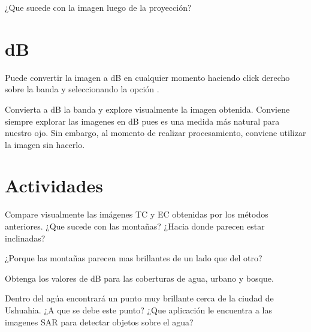 \begin{que}
    ¿Que sucede con la imagen luego de la proyección?
\end{que}

\section{dB}

Puede convertir la imagen a dB en cualquier momento haciendo click derecho sobre la banda y seleccionando la opción .

Convierta a dB la banda  y explore visualmente la imagen obtenida. Conviene siempre explorar las imagenes en dB pues es una medida más natural para nuestro ojo. Sin embargo, al momento de realizar procesamiento, conviene utilizar la imagen sin hacerlo.

\section{Actividades}

\begin{que}
    Compare visualmente las imágenes TC y EC obtenidas por los métodos anteriores. ¿Que sucede con las montañas? ¿Hacia donde parecen estar inclinadas?
\end{que}

\begin{que}
    ¿Porque las montañas parecen mas brillantes de un lado que del otro?
\end{que}

\begin{que}
    Obtenga los valores de dB para las coberturas de agua, urbano y bosque.
\end{que}

\begin{que}
    Dentro del agúa encontrará un punto muy brillante cerca de la ciudad de Ushuahia. ¿A que se debe este punto? ¿Que aplicación le encuentra a las imagenes SAR para detectar objetos sobre el agua?
\end{que}
